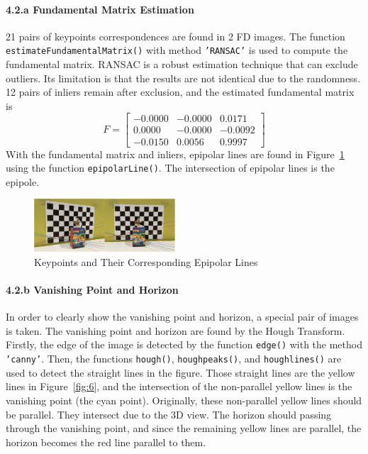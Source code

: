 \documentclass[10pt,twocolumn,letterpaper]{article}
\begin{document}
\paragraph{4.2.a Fundamental Matrix Estimation}
21 pairs of keypoints correspondences are found in 2 FD images. The function \texttt{\textcolor[RGB]{28,172,0}{estimateFundamentalMatrix()}} with method \texttt{\textcolor[RGB]{170,4,249}{'RANSAC'}} is used to compute the fundamental matrix. RANSAC is a robust estimation technique that can exclude outliers. Its limitation is that the results are not identical due to the randomness. 12 pairs of inliers remain after exclusion, and the estimated fundamental matrix is
$$ F=\begin{bmatrix}
-0.0000 & -0.0000 & 0.0171\\ 
0.0000 & -0.0000 & -0.0092\\ 
-0.0150 & 0.0056 & 0.9997
\end{bmatrix} $$
With the fundamental matrix and inliers, epipolar lines are found in Figure~\ref{fig:5} using the function \texttt{\textcolor[RGB]{28,172,0}{epipolarLine()}}. The intersection of epipolar lines is the epipole.

\begin{figure}[h]
\begin{center}
   \includegraphics[width=0.47\textwidth]{4.2}
\end{center}
   \caption{Keypoints and Their Corresponding Epipolar Lines}
\label{fig:5}
\end{figure}


\paragraph{4.2.b Vanishing Point and Horizon}
In order to clearly show the vanishing point and horizon, a special pair of images is taken. The vanishing point and horizon are found by the Hough Transform. Firstly, the edge of the image is detected by the function \texttt{\textcolor[RGB]{28,172,0}{edge()}} with the method \texttt{\textcolor[RGB]{170,4,249}{'canny'}}. Then, the functions \texttt{\textcolor[RGB]{28,172,0}{hough()}}, \texttt{\textcolor[RGB]{28,172,0}{houghpeaks()}}, and \texttt{\textcolor[RGB]{28,172,0}{houghlines()}} are used to detect the straight lines in the figure. Those straight lines are the yellow lines in Figure~\ref{fig:6}, and the intersection of the non-parallel yellow lines is the vanishing point (the cyan point). Originally, these non-parallel yellow lines should be parallel. They intersect due to the 3D view. The horizon should passing through the vanishing point, and since the remaining yellow lines are parallel, the horizon becomes the red line parallel to them.
\end{document}
